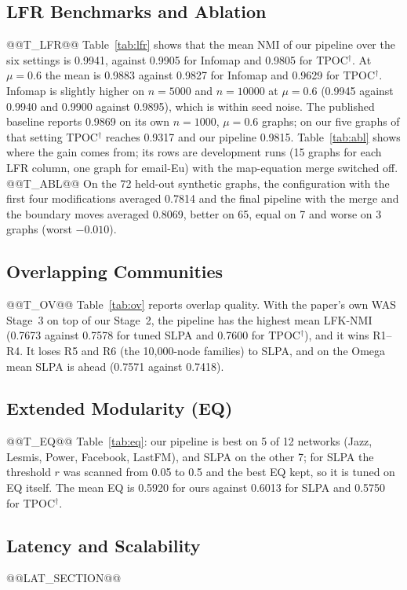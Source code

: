 \documentclass[conference]{IEEEtran}
\begin{document}
\subsection{LFR Benchmarks and Ablation}
@@T_LFR@@
Table~\ref{tab:lfr} shows that the mean NMI of our pipeline over the six settings is 0.9941, against 0.9905 for Infomap and 0.9805 for TPOC$^{\dagger}$. At $\mu{=}0.6$ the mean is 0.9883 against 0.9827 for Infomap and 0.9629 for TPOC$^{\dagger}$. Infomap is slightly higher on $n{=}5000$ and $n{=}10000$ at $\mu{=}0.6$ (0.9945 against 0.9940 and 0.9900 against 0.9895), which is within seed noise. The published baseline reports 0.9869 on its own $n{=}1000$, $\mu{=}0.6$ graphs; on our five graphs of that setting TPOC$^{\dagger}$ reaches 0.9317 and our pipeline 0.9815. Table~\ref{tab:abl} shows where the gain comes from; its rows are development runs (15 graphs for each LFR column, one graph for email-Eu) with the map-equation merge switched off.
@@T_ABL@@
On the 72 held-out synthetic graphs, the configuration with the first four modifications averaged 0.7814 and the final pipeline with the merge and the boundary moves averaged 0.8069, better on 65, equal on 7 and worse on 3 graphs (worst $-0.010$).

\subsection{Overlapping Communities}
@@T_OV@@
Table~\ref{tab:ov} reports overlap quality. With the paper's own WAS Stage~3 on top of our Stage~2, the pipeline has the highest mean LFK-NMI (0.7673 against 0.7578 for tuned SLPA and 0.7600 for TPOC$^{\dagger}$), and it wins R1--R4. It loses R5 and R6 (the 10{,}000-node families) to SLPA, and on the Omega mean SLPA is ahead (0.7571 against 0.7418).

\subsection{Extended Modularity (EQ)}
@@T_EQ@@
Table~\ref{tab:eq}: our pipeline is best on 5 of 12 networks (Jazz, Lesmis, Power, Facebook, LastFM), and SLPA on the other 7; for SLPA the threshold $r$ was scanned from 0.05 to 0.5 and the best EQ kept, so it is tuned on EQ itself. The mean EQ is 0.5920 for ours against 0.6013 for SLPA and 0.5750 for TPOC$^{\dagger}$.

\subsection{Latency and Scalability}\label{sec:latency}
@@LAT_SECTION@@
\end{document}
